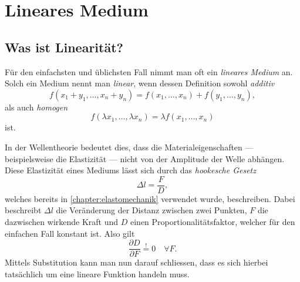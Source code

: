 %
%
%
%
\section{Lineares Medium\label{particles:section:linear}}

\subsection{Was ist Linearität?}
%
Für den einfachsten und üblichsten Fall nimmt man oft ein \emph{lineares Medium} an.
%
Solch ein Medium nennt man \emph{linear}, wenn dessen Definition sowohl \emph{additiv}
%
\[
    f(x_{1} + y_{1}, \ldots, x_{n} + y_{n}) 
    = 
    f(x_{1}, \ldots, x_{n}) 
    + 
    f(y_{1}, \ldots, y_{n}),
\]
als auch \emph{homogen}
%
\[
    f(\lambda x_{1}, \ldots, \lambda x_{n}) 
    = 
    \lambda f(x_{1}, \ldots, x_{n})
\]
ist.

In der Wellentheorie bedeutet dies, 
dass die Materialeigenschaften --- beispielsweise die Elastizität --- nicht von der Amplitude der Welle abhängen.
%
%
Diese Elastizität eines Mediums lässt sich durch das \emph{hookesche Gesetz}
%
\[
    \Delta l
    = 
    \frac{F}{D}
    \label{particles:eq:hookesches-gesetz},
\]
welches bereits in \autoref{chapter:elastomechanik} verwendet wurde, beschreiben.
Dabei beschreibt $\Delta l$ die Veränderung der Distanz zwischen zwei Punkten,
$F$ die dazwischen wirkende Kraft und $D$ einen Proportionalitätsfaktor, 
welcher für den einfachen Fall konstant ist. Also gilt 
\[
    \frac{\partial D}{\partial F} 
    \overset{!}{=} 
    0 
    \quad 
    \forall F.
\]
Mittels Substitution kann man nun darauf schliessen, 
dass es sich hierbei tatsächlich um eine lineare Funktion handeln muss.

